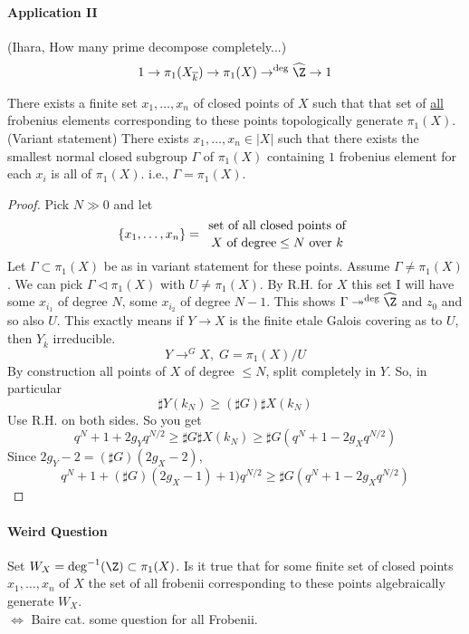 \paragraph{Application II}(Ihara, How many prime decompose completely...)
	$$1\to \pi_1(X_{\overline k})\to \pi_1(X)\to^{\deg}\widehat\Z\to 1$$
	\begin{prop}
	There exists a finite set $x_1, \ldots, x_n$ of closed points of $X$ such that that set of \underline{all} frobenius elements corresponding to these points topologically generate $\pi_1(X)$. \\
	
\noindent
	(Variant statement) There exists $x_1, \ldots, x_n\in |X|$ such that there exists the smallest normal closed subgroup $\Gamma$ of $\pi_1(X)$ containing $1$ frobenius element for each $x_i$ is all of $\pi_1(X)$. i.e., $\Gamma=\pi_1(X)$.
	\end{prop}
\begin{proof} Pick $N\gg 0$ and let 
	$$\left\{x_1, \ldots, x_n\right\}={\text{ set of all closed points of }\atop X\text{ of degree} \leq N\text{ over } k}$$
	Let $\Gamma\subset \pi_1(X)$ be as in variant statement for these points. Assume $\Gamma\neq \pi_1(X)$. We can pick $\Gamma\lhd \pi_1(X)$ with $U\neq \pi_1(X)$. By R.H. for $X$ this set I will have some $x_{i_1}$ of degree $N$, some $x_{i_2}$ of degree $N-1$. This shows $\Gamma\twoheadrightarrow^{\deg}\widehat\Z$ and $z_0$ and so also $U$. This exactly means if $Y\to X$ is the finite etale Galois covering as to $U$, then $Y_{\overline k}$ irreducible. 
		$$Y\to^G X, \; G = \pi_1(X)/U$$
		By construction all points of $X$ of degree $\leq N$, split completely in $Y$. So, in particular 
			$$\sharp Y(k_N)\geq (\sharp G)\sharp X(k_N)$$
			Use R.H. on both sides. So you get
		$$q^N+1+2g_Yq^{N/2}\geq \sharp G\sharp X(k_N)\geq \sharp G(q^N+1-2g_Xq^{N/2})$$
		Since $2g_Y-2 = (\sharp G)(2g_X-2)$, 
		$$q^N+1+(\sharp G)(2g_X-1)+1)q^{N/2}\geq \sharp G(q^N+1-2g_Xq^{N/2})$$
\end{proof}	

\paragraph{Weird Question} Set $W_X = \deg^{-1}(\Z)\subset \pi_1(X)$. Is it true that for some finite set of closed points $x_1, \ldots, x_n$ of $X$ the set of all frobenii corresponding to these points algebraically generate $W_X$. \\
$\iff$ Baire cat. some question for all Frobenii. 

